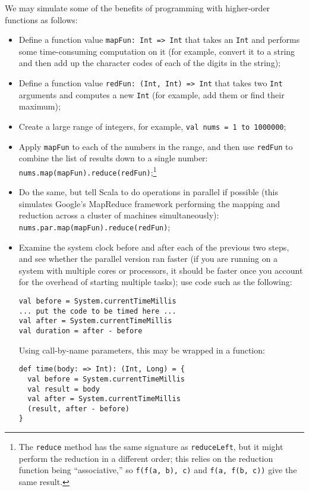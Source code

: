 \begin{exercises}
\problem We may simulate some of the benefits of programming with higher-order functions as follows:
\begin{itemize}
\item Define a function value \verb|mapFun: Int => Int| that takes an \texttt{Int} and performs some time-consuming computation on it (for example, convert it to a string and then add up the character codes of each of the digits in the string);
\item Define a function value \verb|redFun: (Int, Int) => Int| that takes two \texttt{Int} arguments and computes a new \texttt{Int} (for example, add them or find their maximum);
\item Create a large range of integers, for example, \texttt{val nums = 1 to 1000000};
\item Apply \texttt{mapFun} to each of the numbers in the range, and then use \texttt{redFun} to combine the list of results down to a single number: \verb|nums.map(mapFun).reduce(redFun)|;\footnote{The \texttt{reduce} method has the same signature as \texttt{reduceLeft}, but it might perform the reduction in a different order; this relies on the reduction function being ``associative,'' so \texttt{f(f(a, b), c)} and \texttt{f(a, f(b, c))} give the same result.}
\item Do the same, but tell Scala to do operations in parallel if possible (this simulates Google's MapReduce framework performing the mapping and reduction across a cluster of machines simultaneously): \verb|nums.par.map(mapFun).reduce(redFun)|;
\item Examine the system clock before and after each of the previous two steps, and see whether the parallel version ran faster (if you are running on a system with multiple cores or processors, it should be faster once you account for the overhead of starting multiple tasks); use code such as the following:
\begin{verbatim}
val before = System.currentTimeMillis
... put the code to be timed here ...
val after = System.currentTimeMillis
val duration = after - before
\end{verbatim}
Using call-by-name parameters, this may be wrapped in a function:
\begin{verbatim}
def time(body: => Int): (Int, Long) = {
  val before = System.currentTimeMillis
  val result = body
  val after = System.currentTimeMillis
  (result, after - before)
}
\end{verbatim}
\end{itemize}
\end{exercises}

